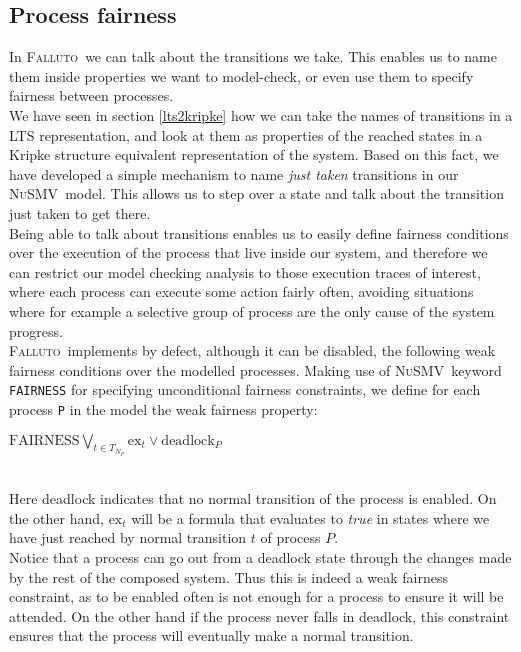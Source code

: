 \documentclass{llncs2e/llncs}
\newcommand{\nusmvSp}{\mbox{\textsc{NuSMV~}}}
\newcommand{\fallutoSp}{\nohyphens{\textsc{Falluto~}}}  %
\newcommand{\textfll}[1]{\texttt{#1}}                   %
\newcommand{\textps}[1]{\textit{#1}}                    %
\newcommand{\centerthis}[1]{\vspace{0.2cm}\\\centerline{#1}\vspace{0.2cm}\\}
\begin{document}
\subsection{Process fairness}\label{process fairness}
In \fallutoSp we can talk about the transitions we take. This enables us to name them inside properties we want to model-check, or even use them to specify fairness between processes.\\
We have seen in section \ref{lts2kripke} how we can take the names of transitions in a LTS representation, and look at them as properties of the reached states in a Kripke structure equivalent representation of the system. Based on this fact, we have developed a simple mechanism to name \textit{just taken} transitions in our \nusmvSp model. This allows us to step over a state and talk about the transition just taken to get there.\\
Being able to talk about transitions enables us to easily define fairness
conditions over the execution of the process that live inside our system, and therefore we can restrict our model checking analysis to those execution traces of interest, where each process
can execute some action fairly often, avoiding situations where for example a
selective group of process are the only cause of the system progress.\\
\fallutoSp implements by defect, although it can be disabled, the following weak fairness
conditions over the modelled processes. Making use of \nusmvSp keyword \textfll{FAIRNESS} for specifying unconditional fairness constraints, we define for each process \texttt{P} in the model the weak fairness property: \centerthis{$\text{FAIRNESS} \bigvee_{t \in T_{N_{P}}} \text{ex}_t \vee \text{deadlock}_P$}
Here deadlock indicates that no normal transition of the process is enabled. On the other hand, $\text{ex}_t$ will be a formula that evaluates to \textps{true} in states where we have just reached by normal transition $t$ of process $P$.\\
Notice that a process can go out from a deadlock state through the changes made by the rest of the composed system. Thus this is indeed a weak fairness constraint, as to be enabled often is not enough for a process to ensure it will be attended. On the other hand if the process never falls in deadlock, this constraint ensures that the process will eventually make a normal transition.
\end{document}
